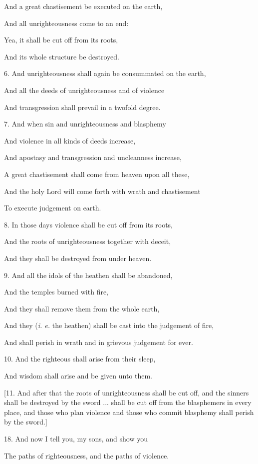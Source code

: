 And a great chastisement be executed on the earth,

And all unrighteousness come to an end:

Yea, it shall be cut off from its roots,

And its whole structure be destroyed.

6. And unrighteousness shall again be consummated on the earth,

And all the deeds of unrighteousness and of violence

And transgression shall prevail in a twofold degree.

7. And when sin and unrighteousness and blasphemy

And violence in all kinds of deeds increase,

And apostasy and transgression and uncleanness increase,

A great chastisement shall come from heaven upon all these,

And the holy Lord will come forth with wrath and chastisement

To execute judgement on earth.

8. In those days violence shall be cut off from its roots,

And the roots of unrighteousness together with deceit,

And they shall be destroyed from under heaven.

9. And all the idols of the heathen shall be abandoned,

And the temples burned with fire,

And they shall remove them from the whole earth,

And they (\emph{i. e.} the heathen) shall be cast into the judgement of fire,

And shall perish in wrath and in grievous judgement for ever.

10. And the righteous shall arise from their sleep,

And wisdom shall arise and be given unto them.

[11. And after that the roots of unrighteousness
shall be cut off, and the sinners shall be destroyed by
the sword ... shall be cut off from the blasphemers
in every place, and those who plan violence and those
who commit blasphemy shall perish by the sword.]

18. And now I tell you, my sons, and show you

The paths of righteousness, and the paths of violence.

